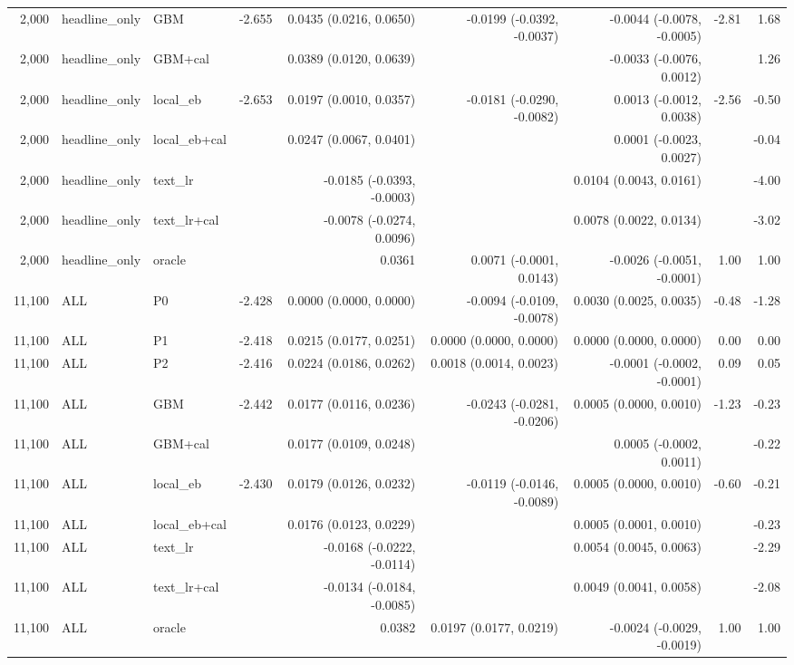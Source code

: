 \begin{tabular}{rllrrrrrr}
2,000 & headline\_only & GBM & -2.655 & 0.0435 (0.0216, 0.0650) & -0.0199 (-0.0392, -0.0037) & -0.0044 (-0.0078, -0.0005) & -2.81 & 1.68 \\
2,000 & headline\_only & GBM+cal &  & 0.0389 (0.0120, 0.0639) &  & -0.0033 (-0.0076, 0.0012) &  & 1.26 \\
2,000 & headline\_only & local\_eb & -2.653 & 0.0197 (0.0010, 0.0357) & -0.0181 (-0.0290, -0.0082) & 0.0013 (-0.0012, 0.0038) & -2.56 & -0.50 \\
2,000 & headline\_only & local\_eb+cal &  & 0.0247 (0.0067, 0.0401) &  & 0.0001 (-0.0023, 0.0027) &  & -0.04 \\
2,000 & headline\_only & text\_lr &  & -0.0185 (-0.0393, -0.0003) &  & 0.0104 (0.0043, 0.0161) &  & -4.00 \\
2,000 & headline\_only & text\_lr+cal &  & -0.0078 (-0.0274, 0.0096) &  & 0.0078 (0.0022, 0.0134) &  & -3.02 \\
2,000 & headline\_only & oracle & & 0.0361 & 0.0071 (-0.0001, 0.0143) & -0.0026 (-0.0051, -0.0001) & 1.00 & 1.00 \\
11,100 & ALL & P0 & -2.428 & 0.0000 (0.0000, 0.0000) & -0.0094 (-0.0109, -0.0078) & 0.0030 (0.0025, 0.0035) & -0.48 & -1.28 \\
11,100 & ALL & P1 & -2.418 & 0.0215 (0.0177, 0.0251) & 0.0000 (0.0000, 0.0000) & 0.0000 (0.0000, 0.0000) & 0.00 & 0.00 \\
11,100 & ALL & P2 & -2.416 & 0.0224 (0.0186, 0.0262) & 0.0018 (0.0014, 0.0023) & -0.0001 (-0.0002, -0.0001) & 0.09 & 0.05 \\
11,100 & ALL & GBM & -2.442 & 0.0177 (0.0116, 0.0236) & -0.0243 (-0.0281, -0.0206) & 0.0005 (0.0000, 0.0010) & -1.23 & -0.23 \\
11,100 & ALL & GBM+cal &  & 0.0177 (0.0109, 0.0248) &  & 0.0005 (-0.0002, 0.0011) &  & -0.22 \\
11,100 & ALL & local\_eb & -2.430 & 0.0179 (0.0126, 0.0232) & -0.0119 (-0.0146, -0.0089) & 0.0005 (0.0000, 0.0010) & -0.60 & -0.21 \\
11,100 & ALL & local\_eb+cal &  & 0.0176 (0.0123, 0.0229) &  & 0.0005 (0.0001, 0.0010) &  & -0.23 \\
11,100 & ALL & text\_lr &  & -0.0168 (-0.0222, -0.0114) &  & 0.0054 (0.0045, 0.0063) &  & -2.29 \\
11,100 & ALL & text\_lr+cal &  & -0.0134 (-0.0184, -0.0085) &  & 0.0049 (0.0041, 0.0058) &  & -2.08 \\
11,100 & ALL & oracle & & 0.0382 & 0.0197 (0.0177, 0.0219) & -0.0024 (-0.0029, -0.0019) & 1.00 & 1.00 \\

\end{tabular}
